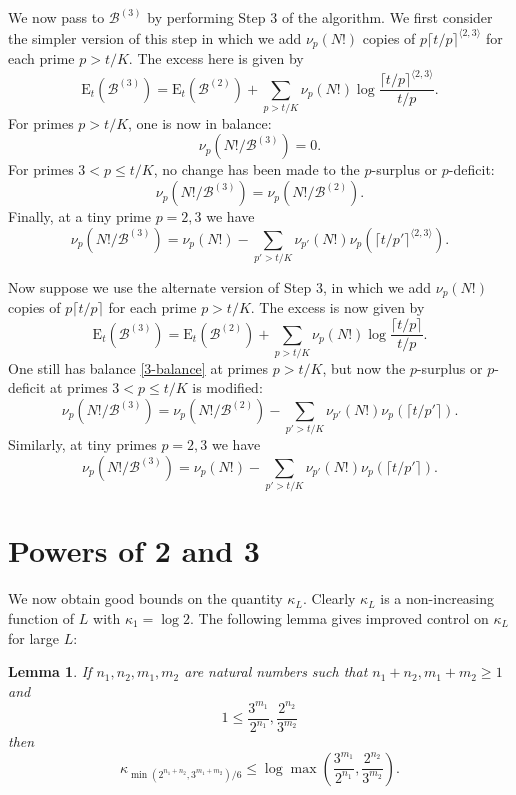 \documentclass[12pt,a4paper,reqno]{amsart}
\numberwithin{equation}{section}
\theoremstyle{plain}
\newtheorem{lemma}[theorem]{Lemma}
\theoremstyle{definition}
\newcommand\tuple{{\mathcal B}}
\newcommand\excess{{\mathrm{E}}}
\begin{document}
We now pass to $\tuple^{(3)}$ by performing Step 3 of the algorithm.  We first consider the simpler version of this step in which we add $\nu_p(N!)$ copies of $p \lceil t/p\rceil^{\langle 2,3 \rangle}$ for each prime $p > t/K$.  The excess here is given by
\begin{equation}\label{excess-eq}
  \excess_t(\tuple^{(3)}) = \excess_t(\tuple^{(2)}) + \sum_{p > t/K} \nu_p(N!) \log \frac{\lceil t/p \rceil^{\langle 2,3 \rangle}}{t/p}.
\end{equation}
For primes $p >t/K$, one is now in balance:
\begin{equation}\label{3-balance}  
  \nu_p(N!/\tuple^{(3)}) = 0. \end{equation}
For primes $3 < p \leq t/K$, no change has been made to the $p$-surplus or $p$-deficit:
$$ \nu_p(N!/\tuple^{(3)}) = \nu_p(N!/\tuple^{(2)}).$$
Finally, at a tiny prime $p=2,3$ we have
$$ \nu_{p}(N!/\tuple^{(3)}) = \nu_{p}(N!) - \sum_{p' > t/K} \nu_{p'}(N!) \nu_{p}(\lceil t/p' \rceil^{\langle 2,3 \rangle}).$$

Now suppose we use the alternate version of Step 3, in which we add $\nu_p(N!)$ copies of $p \lceil t/p\rceil$ for each prime $p > t/K$.  The excess is now given by
\begin{equation}\label{excess-eq-alt}
  \excess_t(\tuple^{(3)}) = \excess_t(\tuple^{(2)}) + \sum_{p > t/K} \nu_p(N!) \log \frac{\lceil t/p \rceil}{t/p}.
\end{equation}
One still has balance \eqref{3-balance} at primes $p>t/K$, but now the $p$-surplus or $p$-deficit at primes $3 < p \leq t/K$ is modified:
\begin{equation}\label{mod}
   \nu_p(N!/\tuple^{(3)}) = \nu_p(N!/\tuple^{(2)}) -
\sum_{p' > t/K} \nu_{p'}(N!) \nu_{p}(\lceil t/p' \rceil).\end{equation}
Similarly, at tiny primes $p=2,3$ we have
$$ \nu_p(N!/\tuple^{(3)}) = \nu_p(N!) -
\sum_{p' > t/K} \nu_{p'}(N!) \nu_{p}(\lceil t/p' \rceil).$$

\section{Powers of 2 and 3}\label{power-sec}

We now obtain good bounds on the quantity $\kappa_L$.  Clearly $\kappa_L$ is a non-increasing function of $L$ with $\kappa_1 = \log 2$.  The following lemma gives improved control on $\kappa_L$ for large $L$:

\begin{lemma}\label{lemcount-0}  If $n_1,n_2,m_1,m_2$ are natural numbers such that $n_1+n_2, m_1+m_2 \geq 1$ and
$$ 1 \leq \frac{3^{m_1}}{2^{n_1}}, \frac{2^{n_2}}{3^{m_2}}$$
then
$$ \kappa_{\min( 2^{n_1+n_2},3^{m_1+m_2})/6} \leq \log \max\left(\frac{3^{m_1}}{2^{n_1}}, \frac{2^{n_2}}{3^{m_2}}\right).$$
\end{lemma}
\end{document}
